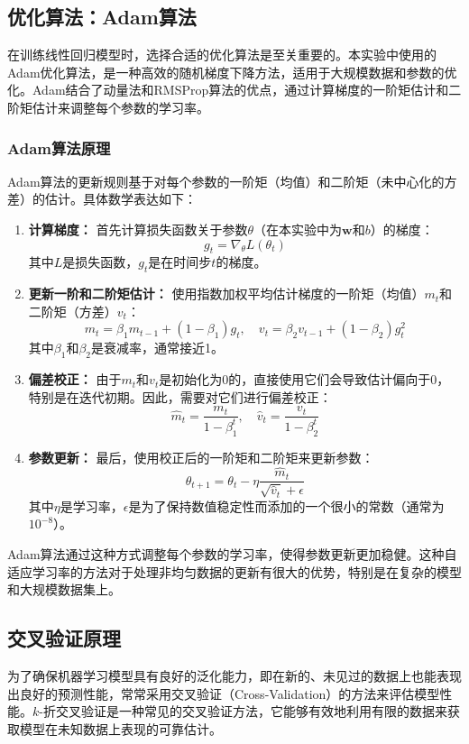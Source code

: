 \documentclass[a4paper,12pt]{article}
\begin{document}
\subsection{优化算法：Adam算法}
在训练线性回归模型时，选择合适的优化算法是至关重要的。本实验中使用的Adam优化算法，是一种高效的随机梯度下降方法，适用于大规模数据和参数的优化。Adam结合了动量法和RMSProp算法的优点，通过计算梯度的一阶矩估计和二阶矩估计来调整每个参数的学习率。

\subsubsection{Adam算法原理}
Adam算法的更新规则基于对每个参数的一阶矩（均值）和二阶矩（未中心化的方差）的估计。具体数学表达如下：

\begin{enumerate}
	\item \textbf{计算梯度：} 首先计算损失函数关于参数$\theta$（在本实验中为$\mathbf{w}$和$b$）的梯度：
	\[
	g_t = \nabla_{\theta} L(\theta_t)
	\]
	其中$L$是损失函数，$g_t$是在时间步$t$的梯度。
	
	\item \textbf{更新一阶和二阶矩估计：} 使用指数加权平均估计梯度的一阶矩（均值）$m_t$和二阶矩（方差）$v_t$：
	\[
	m_t = \beta_1 m_{t-1} + (1 - \beta_1) g_t, \quad v_t = \beta_2 v_{t-1} + (1 - \beta_2) g_t^2
	\]
	其中$\beta_1$和$\beta_2$是衰减率，通常接近1。
	
	\item \textbf{偏差校正：} 由于$m_t$和$v_t$是初始化为0的，直接使用它们会导致估计偏向于0，特别是在迭代初期。因此，需要对它们进行偏差校正：
	\[
	\hat{m}_t = \frac{m_t}{1 - \beta_1^t}, \quad \hat{v}_t = \frac{v_t}{1 - \beta_2^t}
	\]
	
	\item \textbf{参数更新：} 最后，使用校正后的一阶矩和二阶矩来更新参数：
	\[
	\theta_{t+1} = \theta_t - \eta \frac{\hat{m}_t}{\sqrt{\hat{v}_t} + \epsilon}
	\]
	其中$\eta$是学习率，$\epsilon$是为了保持数值稳定性而添加的一个很小的常数（通常为$10^{-8}$）。
\end{enumerate}

Adam算法通过这种方式调整每个参数的学习率，使得参数更新更加稳健。这种自适应学习率的方法对于处理非均匀数据的更新有很大的优势，特别是在复杂的模型和大规模数据集上。


\subsection{交叉验证原理}
为了确保机器学习模型具有良好的泛化能力，即在新的、未见过的数据上也能表现出良好的预测性能，常常采用交叉验证（Cross-Validation）的方法来评估模型性能。$k$-折交叉验证是一种常见的交叉验证方法，它能够有效地利用有限的数据来获取模型在未知数据上表现的可靠估计。
\end{document}
